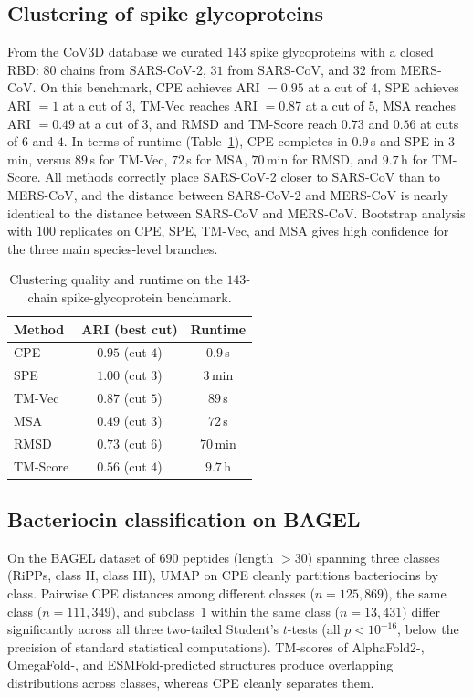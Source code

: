 \documentclass[11pt]{article}
\begin{document}
\subsection{Clustering of spike glycoproteins}
From the CoV3D database \cite{gowthaman2021cov3d} we curated $143$ spike glycoproteins with a closed RBD: $80$ chains from SARS-CoV-2, $31$ from SARS-CoV, and $32$ from MERS-CoV. On this benchmark, CPE achieves ARI $=0.95$ at a cut of $4$, SPE achieves ARI $=1$ at a cut of $3$, TM-Vec reaches ARI $=0.87$ at a cut of $5$, MSA reaches ARI $=0.49$ at a cut of $3$, and RMSD and TM-Score reach $0.73$ and $0.56$ at cuts of $6$ and $4$. In terms of runtime (Table~\ref{tab:runtime}), CPE completes in $0.9$\,s and SPE in $3$\,min, versus $89$\,s for TM-Vec, $72$\,s for MSA, $70$\,min for RMSD, and $9.7$\,h for TM-Score. All methods correctly place SARS-CoV-2 closer to SARS-CoV than to MERS-CoV, and the distance between SARS-CoV-2 and MERS-CoV is nearly identical to the distance between SARS-CoV and MERS-CoV. Bootstrap analysis with $100$ replicates on CPE, SPE, TM-Vec, and MSA gives high confidence for the three main species-level branches.

\begin{table}[h]
\centering
\caption{Clustering quality and runtime on the $143$-chain spike-glycoprotein benchmark.}
\label{tab:runtime}
\begin{tabular}{lcc}
\toprule
Method & ARI (best cut) & Runtime \\
\midrule
CPE & $0.95$ (cut $4$) & $0.9$\,s \\
SPE & $1.00$ (cut $3$) & $3$\,min \\
TM-Vec & $0.87$ (cut $5$) & $89$\,s \\
MSA & $0.49$ (cut $3$) & $72$\,s \\
RMSD & $0.73$ (cut $6$) & $70$\,min \\
TM-Score & $0.56$ (cut $4$) & $9.7$\,h \\
\bottomrule
\end{tabular}
\end{table}

\subsection{Bacteriocin classification on BAGEL}
On the BAGEL dataset \cite{vandeheuvel2018bagel} of $690$ peptides (length $>30$) spanning three classes (RiPPs, class II, class III), UMAP on CPE cleanly partitions bacteriocins by class. Pairwise CPE distances among different classes ($n = 125{,}869$), the same class ($n = 111{,}349$), and subclass~1 within the same class ($n = 13{,}431$) differ significantly across all three two-tailed Student's $t$-tests (all $p < 10^{-16}$, below the precision of standard statistical computations). TM-scores of AlphaFold2-, OmegaFold-, and ESMFold-predicted structures produce overlapping distributions across classes, whereas CPE cleanly separates them.
\end{document}
